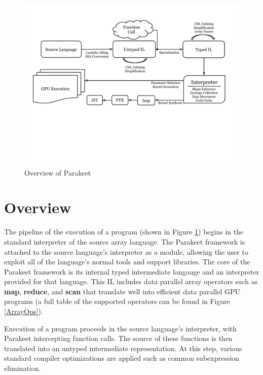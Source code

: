 \documentclass[preprint]{sigplanconf}
\begin{document}
\begin{figure}[t!bh]
\begin{center}
\leavevmode
\includegraphics[scale=0.6, trim=10pt 180pt 10pt 120pt]{Pipeline.pdf}
\end{center}
\caption{Overview of Parakeet}
\label{fig:overview}
\end{figure}
\section{Overview}


The pipeline of the execution of a program (shown in Figure
\ref{fig:overview}) begins in the standard interpreter of the source array
language.  The Parakeet framework is attached to the source language's
interpreter as a module, allowing the user to exploit 
all of the language's normal
tools and support libraries.  The core of the Parakeet framework is its internal
typed intermediate langauge and an interpreter provided for that language. This
IL includes data parallel array operators such as \textbf{map},
\textbf{reduce}, and \textbf{scan} that translate well into efficient data
parallel GPU programs (a full table of the supported operators
can be found in Figure \ref{ArrayOps}).

Execution of a program proceeds in the source language's interpreter, with
Parakeet intercepting function calls.  The source of these functions is then
translated into an untyped intermediate representation. At this step,
various standard compiler optimizations are applied such as common subexpression
elimination.
\end{document}
